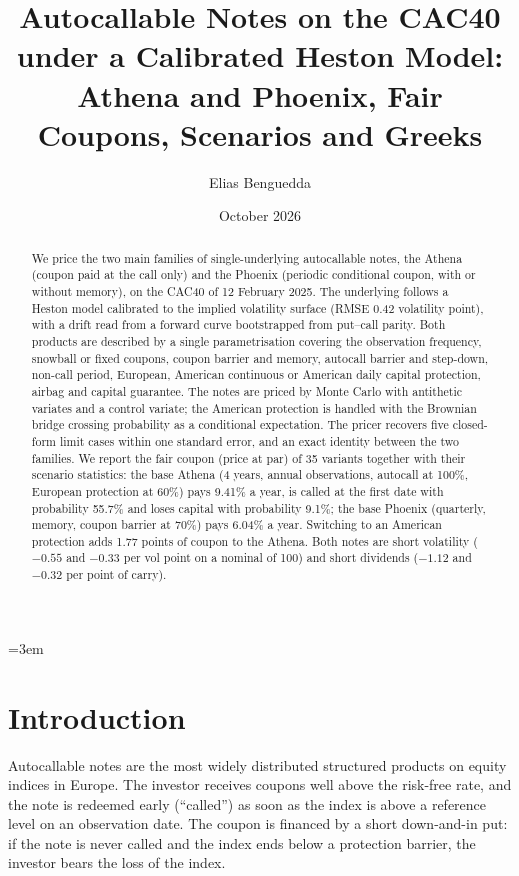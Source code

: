 \documentclass[11pt,a4paper]{article}
\title{Autocallable Notes on the CAC40 under a Calibrated Heston Model:\\
Athena and Phoenix, Fair Coupons, Scenarios and Greeks}
\author{Elias Benguedda}
\date{October 2026}
\begin{document}
\emergencystretch=3em
\maketitle

\begin{abstract}
We price the two main families of single-underlying autocallable notes, the Athena (coupon paid at the call
only) and the Phoenix (periodic conditional coupon, with or without memory), on the CAC40 of 12 February 2025.
The underlying follows a Heston model calibrated to the implied volatility surface (RMSE 0.42 volatility point),
with a drift read from a forward curve bootstrapped from put--call parity. Both products are described by a
single parametrisation covering the observation frequency, snowball or fixed coupons, coupon barrier and memory,
autocall barrier and step-down, non-call period, European, American continuous or American daily capital
protection, airbag and capital guarantee. The notes are priced by Monte Carlo with antithetic variates and a
control variate; the American protection is handled with the Brownian bridge crossing probability as a
conditional expectation. The pricer recovers five closed-form limit cases within one standard error, and an exact identity between the
two families. We report
the fair coupon (price at par) of 35 variants together with their scenario statistics: the base Athena (4 years,
annual observations, autocall at 100\%, European protection at 60\%) pays 9.41\% a year, is called at the first
date with probability 55.7\% and loses capital with probability 9.1\%; the base Phoenix (quarterly, memory, coupon
barrier at 70\%) pays 6.04\% a year. Switching to an American protection adds 1.77 points of coupon to the Athena.
Both notes are short volatility ($-0.55$ and $-0.33$ per vol point on a nominal of 100) and short dividends
($-1.12$ and $-0.32$ per point of carry).
\end{abstract}

\tableofcontents
\newpage

\section{Introduction}
Autocallable notes are the most widely distributed structured products on equity indices in Europe. The investor
receives coupons well above the risk-free rate, and the note is redeemed early (``called'') as soon as the index is
above a reference level on an observation date. The coupon is financed by a short down-and-in put: if the note
is never called and the index ends below a protection barrier, the investor bears the loss of the index.
\end{document}
